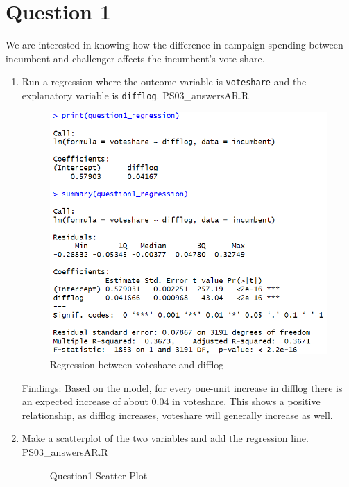 \documentclass[12pt,letterpaper]{article}
\begin{document}
\section*{Question 1}
\vspace{.25cm}
\noindent We are interested in knowing how the difference in campaign spending between incumbent and challenger affects the incumbent's vote share. 
\begin{enumerate}
		\item Run a regression where the outcome variable is \texttt{voteshare} and the explanatory variable is \texttt{difflog}.
		 {PS03_answersAR.R}
		\begin{figure}[h!]\centering
			\caption{\footnotesize Regression between voteshare and difflog}
			\label{}
			\includegraphics[width=.85\textwidth]{question1_regression.png}
		\end{figure}
			Findings: Based on the model, for every one-unit increase in difflog there is an expected increase of about 0.04 in voteshare. This shows a positive relationship, as difflog increases, voteshare will generally increase as well.
		\vspace{5cm}
		\item Make a scatterplot of the two variables and add the regression line.
		 {PS03_answersAR.R}
		\begin{figure}[h!]\centering
			\caption{\footnotesize Question1 Scatter Plot}
			\label{}

\end{figure}
\end{enumerate}
\end{document}
